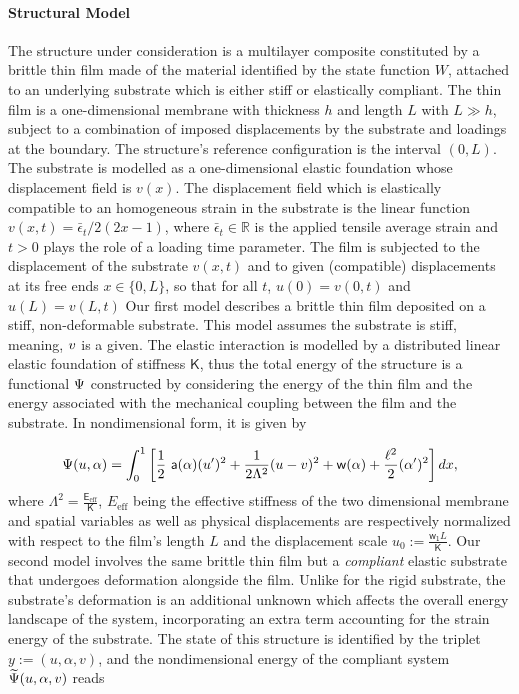 \paragraph{Structural Model}
The structure under consideration is a multilayer composite constituted by a brittle thin film  made of the material identified by the state function $W$, attached to an underlying substrate which is either {stiff} or elastically compliant. The thin film is a one-dimensional membrane with thickness $h$ and length $L$ with $L\gg h$, subject to a combination of imposed displacements by the substrate and loadings at the boundary. The structure's reference configuration is the interval $(0, L)$.
% 
The substrate is modelled as a one-dimensional elastic foundation whose displacement field is $v(x)$.
% 
The displacement field which is elastically compatible to an homogeneous strain in the substrate is the linear function $v(x, t) = \bar\epsilon_t/2 (2x-1)$, where {$\bar\epsilon_t\in \mathbb R$} is the applied tensile {average} strain and $t>0$ plays the role of a loading time parameter.
% 
The film is subjected to {the displacement of the substrate} $v(x, t)$ and to given (compatible) displacements at its free ends $x \in \{0, L\}$, so that for all $t$, $u(0)=v(0, t)$ and $u(L)=v(L, t)$
% 
Our first model describes a brittle thin film deposited on a stiff, non-deformable substrate. This model assumes the substrate is {stiff}, meaning, $v$ is a given. The elastic interaction is modelled by a distributed linear elastic foundation of stiffness $\mathsf{K}$, thus
the total energy of the structure is a functional $\Psi$ constructed by considering the energy of the thin film and the energy associated with  the mechanical coupling between the film and the substrate. In nondimensional form, it is given by

\begin{equation}
    \label{def:energy_stiff}
    \Psi( u, \alpha) = \int_{0}^{1} \left[ \frac{1}{2} \ \soften(\alpha)(u')^2
        + \frac{1}{2 \elastell^2} (u-\subsu)^2
        + \homogdiss(\alpha) + \frac{\damagell^2}{2}(\alpha')^2
        \right] dx,
\end{equation}
where $\Lambda^2 = \frac{\mathsf E_{\text{eff}}}{\mathsf{K}}$, $E_{\text{eff}}$ being the effective stiffness of the two dimensional {membrane} {and spatial variables as well as physical displacements are respectively normalized with respect to the film's length $L$ and the displacement scale $u_0 := \frac{\mathsf{w_1}L}{\mathsf{K}}$}.
Our second model involves the same brittle thin film but a \emph{compliant} elastic substrate that undergoes deformation alongside the film. Unlike for the rigid substrate, the substrate's deformation is an additional unknown which affects the overall energy landscape of the system, incorporating an extra term accounting for the strain energy of the substrate.
The state of this structure is identified by the triplet $y:=(u, \alpha, v)$, and the nondimensional energy of the compliant system  $\widetilde\Psi( u, \alpha, v)$ reads

